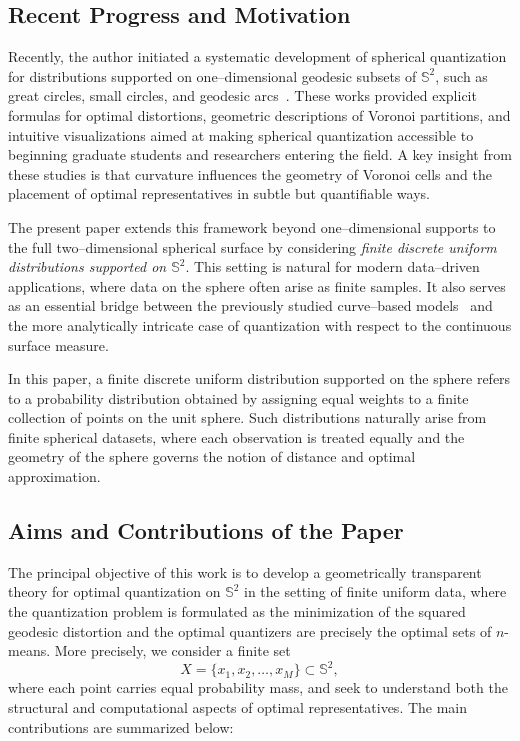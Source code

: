 \documentclass[12pt, reqno]{amsart}
\theoremstyle{plain}
\theoremstyle{definition}
\newcommand{\D}[1]{\mathbb{#1}}%
\begin{document}
\subsection*{Recent Progress and Motivation}
Recently, the author initiated a systematic development of spherical quantization for distributions supported on one--dimensional geodesic subsets of $\mathbb{S}^2$, such as great circles, small circles, and geodesic arcs~\cite{Roychowdhury2025a,Roychowdhury2025b}. These works provided explicit formulas for optimal distortions, geometric descriptions of Voronoi partitions, and intuitive visualizations aimed at making spherical quantization accessible to beginning graduate students and researchers entering the field. A key insight from these studies is that curvature influences the geometry of Voronoi cells and the placement of optimal representatives in subtle but quantifiable ways.

The present paper extends this framework beyond one--dimensional supports to the full two--dimensional spherical surface by considering \emph{finite discrete uniform distributions supported on $\mathbb{S}^2$}. This setting is natural for modern data--driven applications, where data on the sphere often arise as finite samples. It also serves as an essential bridge between the previously studied curve--based models~\cite{Roychowdhury2025a,Roychowdhury2025b} and the more analytically intricate case of quantization with respect to the continuous surface measure.


In this paper, a finite discrete uniform distribution supported on the sphere refers to a probability distribution obtained by assigning equal weights to a finite collection of points on the unit sphere. Such distributions naturally arise from finite spherical datasets, where each observation is treated equally and the geometry of the sphere governs the notion of distance and optimal approximation.

\subsection*{Aims and Contributions of the Paper}
The principal objective of this work is to develop a geometrically transparent theory for optimal quantization on $\D S^2$
 in the setting of finite uniform data, where the quantization problem is formulated as the minimization of the squared geodesic distortion and the optimal quantizers are precisely the optimal sets of $n$-means.  More precisely, we consider a finite set
\[
X = \{ {x}_1,  {x}_2, \ldots,  {x}_M\} \subset \mathbb{S}^2,
\]
where each point carries equal probability mass, and seek to understand both the structural and computational aspects of optimal representatives. The main contributions are summarized below:
\end{document}
